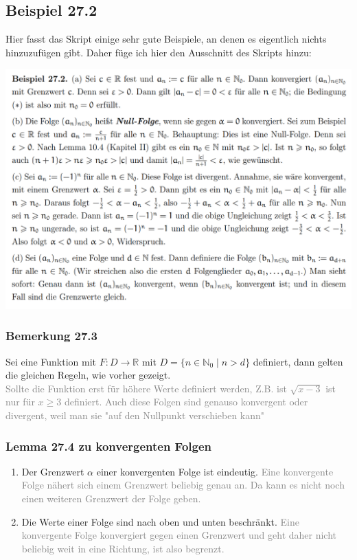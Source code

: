 \documentclass{report}
\begin{document}
			\subsection{Beispiel 27.2}
				Hier fasst das Skript einige sehr gute Beispiele, an denen es eigentlich nichts hinzuzufügen gibt. Daher füge ich hier den Ausschnitt des Skripts hinzu:\\
				\begin{center} \includegraphics[width = 15cm]{pictures/Beispiel 27.2} \end{center}
			\subsubsection{Bemerkung 27.3}
				Sei eine Funktion mit $F:D \rightarrow \mathbb{R}$ mit $D = \{n \in \mathbb{N}_0 \mid n > d\}$ definiert, dann gelten die gleichen Regeln, wie vorher gezeigt. \\
				\textcolor{gray}{Sollte die Funktion erst für höhere Werte definiert werden, Z.B. ist $\sqrt{x-3}$ ist nur für $x \geq 3$ definiert. Auch diese Folgen sind genauso konvergent oder divergent, weil man sie "auf den Nullpunkt verschieben kann" }
			\subsubsection{Lemma 27.4 zu konvergenten Folgen}
				\begin{enumerate}[label=(\alph*)]
					\item Der Grenzwert $\alpha$ einer konvergenten Folge ist eindeutig.
					\textcolor{gray}{Eine konvergente Folge nähert sich einem Grenzwert beliebig genau an. Da kann es nicht noch einen weiteren Grenzwert der Folge geben.}
					\item Die Werte einer Folge sind nach oben und unten beschränkt.
					\textcolor{gray}{Eine konvergente Folge konvergiert gegen einen Grenzwert und geht daher nicht beliebig weit in eine Richtung, ist also begrenzt.}
				\end{enumerate}
\end{document}
